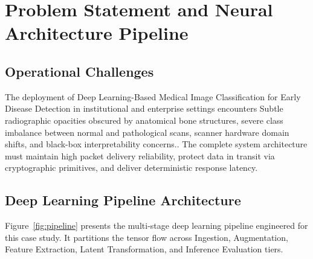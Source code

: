 \section{Problem Statement and Neural Architecture Pipeline}

\subsection{Operational Challenges}
The deployment of Deep Learning-Based Medical Image Classification for Early Disease Detection in institutional and enterprise settings encounters Subtle radiographic opacities obscured by anatomical bone structures, severe class imbalance between normal and pathological scans, scanner hardware domain shifts, and black-box interpretability concerns.. The complete system architecture must maintain high packet delivery reliability, protect data in transit via cryptographic primitives, and deliver deterministic response latency.

\subsection{Deep Learning Pipeline Architecture}
Figure~\ref{fig:pipeline} presents the multi-stage deep learning pipeline engineered for this case study. It partitions the tensor flow across Ingestion, Augmentation, Feature Extraction, Latent Transformation, and Inference Evaluation tiers.

